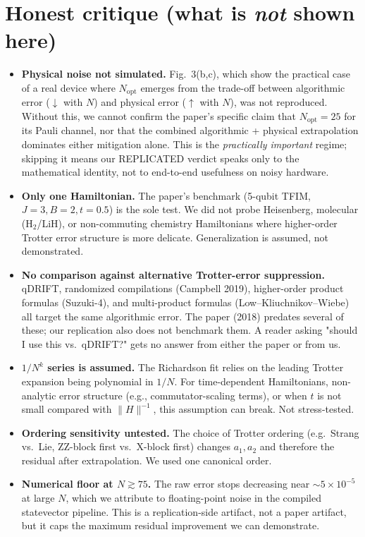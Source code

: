 \documentclass[11pt]{article}
\begin{document}
\section{Honest critique (what is \emph{not} shown here)}
\begin{itemize}
  \item \textbf{Physical noise not simulated.} Fig.~3(b,c), which show
        the practical case of a real device where $N_{\text{opt}}$
        emerges from the trade-off between algorithmic error
        ($\downarrow$ with $N$) and physical error ($\uparrow$ with
        $N$), was not reproduced. Without this, we cannot confirm the
        paper's specific claim that $N_{\text{opt}}=25$ for its Pauli
        channel, nor that the combined algorithmic + physical
        extrapolation dominates either mitigation alone. This is the
        \emph{practically important} regime; skipping it means our
        REPLICATED verdict speaks only to the mathematical identity,
        not to end-to-end usefulness on noisy hardware.
  \item \textbf{Only one Hamiltonian.} The paper's benchmark (5-qubit
        TFIM, $J{=}3, B{=}2, t{=}0.5$) is the sole test. We did not
        probe Heisenberg, molecular (H$_2$/LiH), or non-commuting
        chemistry Hamiltonians where higher-order Trotter error
        structure is more delicate. Generalization is assumed, not
        demonstrated.
  \item \textbf{No comparison against alternative Trotter-error
        suppression.} qDRIFT, randomized compilations (Campbell 2019),
        higher-order product formulas (Suzuki-4), and multi-product
        formulas (Low--Kliuchnikov--Wiebe) all target the same
        algorithmic error. The paper (2018) predates several of these;
        our replication also does not benchmark them. A reader asking
        "should I use this vs.\ qDRIFT?" gets no answer from either
        the paper or from us.
  \item \textbf{$1/N^k$ series is assumed.} The Richardson fit relies
        on the leading Trotter expansion being polynomial in $1/N$.
        For time-dependent Hamiltonians, non-analytic error structure
        (e.g., commutator-scaling terms), or when $t$ is not small
        compared with $\|H\|^{-1}$, this assumption can break. Not
        stress-tested.
  \item \textbf{Ordering sensitivity untested.} The choice of Trotter
        ordering (e.g.\ Strang vs.\ Lie, ZZ-block first vs.\ X-block
        first) changes $a_1, a_2$ and therefore the residual after
        extrapolation. We used one canonical order.
  \item \textbf{Numerical floor at $N \gtrsim 75$.} The raw error stops
        decreasing near $\sim 5{\times}10^{-5}$ at large $N$, which we
        attribute to floating-point noise in the compiled statevector
        pipeline. This is a replication-side artifact, not a paper
        artifact, but it caps the maximum residual improvement we can
        demonstrate.
\end{itemize}
\end{document}
